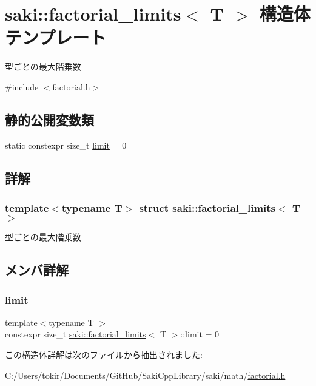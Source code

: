 \hypertarget{structsaki_1_1factorial__limits}{}\section{saki\+:\+:factorial\+\_\+limits$<$ T $>$ 構造体テンプレート}
\label{structsaki_1_1factorial__limits}


型ごとの最大階乗数  




{\ttfamily \#include $<$factorial.\+h$>$}

\subsection*{静的公開変数類}
\begin{DoxyCompactItemize}
\item 
static constexpr size\+\_\+t \mbox{\hyperlink{structsaki_1_1factorial__limits_af8dce5a6f0fd543e312138b15b92dbe8}{limit}} = 0
\end{DoxyCompactItemize}


\subsection{詳解}
\subsubsection*{template$<$typename T$>$\newline
struct saki\+::factorial\+\_\+limits$<$ T $>$}

型ごとの最大階乗数 

\subsection{メンバ詳解}
\mbox{\label{structsaki_1_1factorial__limits_af8dce5a6f0fd543e312138b15b92dbe8}} 
\subsubsection{\texorpdfstring{limit}{limit}}
{\footnotesize\ttfamily template$<$typename T $>$ \\
constexpr size\+\_\+t \mbox{\hyperlink{structsaki_1_1factorial__limits}{saki\+::factorial\+\_\+limits}}$<$ T $>$\+::limit = 0\hspace{0.3cm}{\ttfamily [static]}}



この構造体詳解は次のファイルから抽出されました\+:\begin{DoxyCompactItemize}
\item 
C\+:/\+Users/tokir/\+Documents/\+Git\+Hub/\+Saki\+Cpp\+Library/saki/math/\mbox{\hyperlink{factorial_8h}{factorial.\+h}}\end{DoxyCompactItemize}
